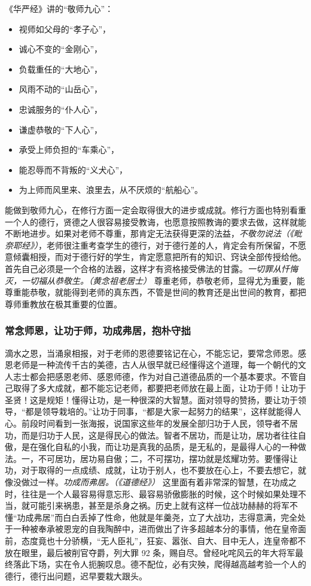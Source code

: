 《华严经》讲的“敬师九心”：\begin{multicols}{2}
    \begin{itemize}
        \item 视师如父母的“孝子心”，
        \item 诚心不变的“金刚心”，
        \item 负载重任的“大地心”，
        \item 风雨不动的“山岳心”，
        \item 忠诚服务的“仆人心”，
        \item 谦虚恭敬的“下人心”，
        \item 承受上师负担的“车乘心”，
        \item 能忍辱而不背叛的“义犬心”，
        \item 为上师而风里来、浪里去，从不厌烦的“航船心”。
    \end{itemize}
\end{multicols}

能做到敬师九心，在修行方面一定会取得很大的进步或成就。修行方面也特别看重一个人的德行，贤德之人很容易接受教诲，也愿意按照教诲的要求去做，这样就能不断地进步。如果对老师不尊重，那肯定无法获得更深的法益，\textit{不敬勿说法（《毗奈耶经》）}，老师很注重考查学生的德行，对于德行差的人，肯定会有所保留，不愿意倾囊相授，而对于德行好的学生，肯定愿意把所有的知识、窍诀全部传授给他。首先自己必须是一个合格的法器，这样才有资格接受佛法的甘露。\textit{一切罪从忏悔灭，一切福从恭敬生。（黄念祖老居士）} 尊重老师，恭敬老师，显得尤为重要，能尊重能恭敬，就能得到老师的真东西，不管是世间的教育还是出世间的教育，都把尊师重教放在极其重要的位置。

\subsubsection{常念师恩，让功于师，功成弗居，抱朴守拙}

滴水之恩，当涌泉相报，对于老师的恩德要铭记在心，不能忘记，要常念师恩。感恩老师是一种流传千古的美德，古人从很早就已经懂得这个道理，每一个朝代的文人志士都会把感恩老师、感恩师德，作为对自己道德品质的一个基本要求。不管自己取得了多大成就，都不能忘记老师，都要把老师放在最上面，让功于师！让功于圣贤！这是规矩！懂得让功，是一种很深的大智慧。面对领导的赞扬，要让功于领导，“都是领导栽培的。”让功于同事，“都是大家一起努力的结果”，这样就能得人心。前段时间看到一张海报，说国家这些年的发展全部归功于人民，领导者不居功，而是归功于人民，这是得民心的做法。智者不居功，而是让功，居功者往往自傲，是在强化自私的小我，而让功是真我的品质，是无私的，是最得人心的一种做法。一，不可居功，居功易自傲；二，不可摆功，摆功就是炫耀功劳。要懂得让功，对于取得的一点成绩、成就，让功于别人，也不要放在心上，不要去想它，就像没做过一样。\textit{功成而弗居。（《道德经》）} 这里面有着非常深的智慧，在功成之时，往往是一个人最容易得意忘形、最容易骄傲膨胀的时候，这个时候如果处理不当，就可能引来祸患，甚至是杀身之祸。历史上就有这样一位战功赫赫的将军不懂“功成弗居”而白白丢掉了性命，他就是年羹尧，立了大战功，志得意满，完全处于一种被奉承被恩宠的自我陶醉中，进而做出了许多超越本分的事情，他在皇帝面前，态度竟也十分骄横，“无人臣礼”，狂妄、嚣张、自大、目中无人，连皇帝都不放在眼里，最后被削官夺爵，列大罪 92 条，赐自尽。曾经叱咤风云的年大将军最终落此下场，实在令人扼腕叹息。德不配位，必有灾殃，爬得越高越考验一个人的德行，德行出问题，迟早要栽大跟头。

